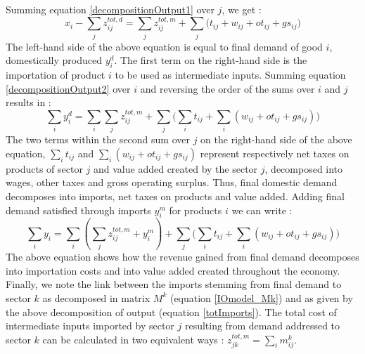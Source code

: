 \documentclass[12pt,english]{article}
\begin{document}
Summing equation \ref{decompositionOutput1} over $j$, we get :
\begin{equation}
x_i - \sum_j z^{tot,d}_{ij}  = \sum_j z^{tot,m}_{ij} + \sum_j \big(t_{ij} + w_{ij} + ot_{ij} + gs_{ij}\big) \label{decompositionOutput2}
\end{equation}
The left-hand side of the above equation is equal to final demand of good $i$, domestically produced $y^d_i$. The first term on the right-hand side is the importation of product $i$ to be used as intermediate inputs. %
Summing equation \ref{decompositionOutput2} over $i$ and reversing the order of the sums over $i$ and $j$ results in :
\begin{equation}
\sum_i y^d_i  = \sum_{i}\sum_{j} z^{tot,m}_{ij} + \sum_j \big( \sum_i t_{ij} + \sum_i (w_{ij} + ot_{ij} + gs_{ij})\big) \label{decompositionOutput3}
\end{equation}
The two terms within the second sum over $j$ on the right-hand side of the above equation, $\sum_i t_{ij}$ and $\sum_i (w_{ij} + ot_{ij} + gs_{ij})$ represent respectively net taxes on products of sector $j$ and value added created by the sector $j$, decomposed into wages, other taxes and gross operating surplus. Thus, final domestic demand decomposes into imports, net taxes on products and value added. Adding final demand satisfied through imports $y^m_i$ for products $i$ we can write :
\begin{equation}
\sum_i y_i =  \sum_i (\sum_{j} z^{tot,m}_{ij} + y^m_i) + \sum_j \big( \sum_i t_{ij} + \sum_i (w_{ij} + ot_{ij} + gs_{ij})\big) \label{decompositionOutput4}
\end{equation}
The above equation shows how the revenue gained from final demand decomposes into importation costs and into value added created throughout the economy. Finally, we note the link between the imports stemming from final demand to sector $k$ as decomposed in matrix $M^k$ (equation \ref{IOmodel_Mk}) and as given by the above decomposition of output (equation \ref{totImports}). The total cost of intermediate inputs imported by sector $j$ resulting from demand addressed to sector $k$ can be calculated in two equivalent ways : $z^{tot,m}_{jk} = \sum_i m_{ij}^k$. %
\end{document}
